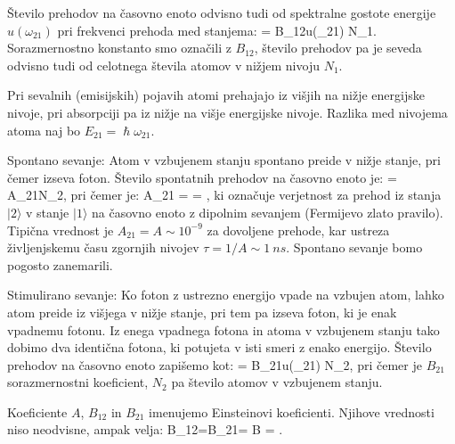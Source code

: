 Število prehodov na časovno enoto odvisno tudi od spektralne gostote 
energije $u(\omega_{21})$ pri frekvenci prehoda med stanjema:
\beq
{} = B_{12}u(\omega_{21}) N_1.
\eeq
Sorazmernostno konstanto smo označili z $B_{12}$, število prehodov pa je seveda odvisno
tudi od celotnega števila atomov v nižjem nivoju $N_1$.



Pri sevalnih (emisijskih) pojavih atomi prehajajo iz višjih na nižje 
energijske nivoje, pri absorpciji pa iz nižje na višje energijske nivoje. 
Razlika med nivojema atoma naj bo $E_{21} = \hslash \omega_{21}$.

Spontano sevanje: Atom v vzbujenem stanju spontano preide v nižje stanje, pri čemer izseva
foton. Število spontatnih prehodov na časovno enoto je:
\beq
{} = A_{21}N_2,
\label{eq:11_07}
\eeq
pri čemer je:
\beq
A_{21} =  = 
,
\eeq
ki označuje verjetnost za prehod iz stanja $|2\rangle$ v stanje $|1\rangle$ na časovno enoto
z dipolnim sevanjem (Fermijevo zlato pravilo). Tipična vrednost je $A_{21}  = A \sim 10^{-9}$ za 
dovoljene prehode, kar ustreza življenjskemu času zgornjih nivojev $\tau = 1/A \sim 1~\si{ns}$. 
Spontano sevanje bomo pogosto zanemarili. 



Stimulirano sevanje: Ko foton z ustrezno energijo vpade na vzbujen atom, lahko atom preide
iz višjega v nižje stanje, pri tem pa izseva foton, ki je enak vpadnemu fotonu. Iz enega 
vpadnega fotona in atoma v vzbujenem stanju tako dobimo dva identična fotona, ki potujeta v isti smeri
z enako energijo. Število prehodov na časovno enoto zapišemo kot:
\beq
{} = B_{21}u(\omega_{21}) N_2,
\eeq
pri čemer je $B_{21}$ sorazmernostni koeficient, $N_2$ pa število atomov v vzbujenem stanju. 

Koeficiente $A$, $B_{12}$ in $B_{21}$ imenujemo Einsteinovi koeficienti. Njihove vrednosti 
niso neodvisne, ampak velja:
\beq
B_{12}=B_{21}= B \qquad {} \qquad {} = .
\eeq


